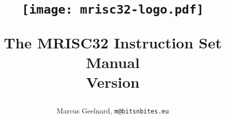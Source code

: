 %

\title{
  \vspace{-0.5in}
  \begin{figure}[h!]
    \texttt{[image: mrisc32-logo.pdf]}
  \end{figure}
  \vspace{1.2in}
  \LARGE \textbf{The MRISC32 Instruction Set Manual} \\
  Version \specrev
  \vspace{-0.1in}}

\author{Marcus Geelnard, \texttt{m@bitsnbites.eu}}


{\let\center\flushleft
\let\endcenter\endflushleft
\maketitle}

